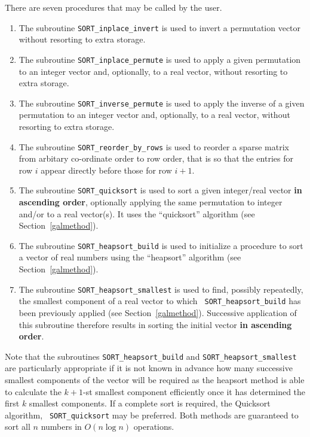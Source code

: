 \documentclass{galahad}
\newcommand{\packagename}{SORT}
\begin{document}
There are seven procedures that may be called by the user.
\begin{enumerate}
\item The subroutine {\tt \packagename\_inplace\_invert} is used to invert a
permutation vector without resorting to extra storage.
\item The subroutine {\tt \packagename\_inplace\_permute} is used to apply
a given permutation to an integer vector and, optionally,
to a real vector, without resorting to extra storage.
\item The subroutine {\tt \packagename\_inverse\_permute} is used to apply
the inverse of a given permutation to an integer vector 
and, optionally, to a real vector, without resorting to extra 
storage.
\item The subroutine {\tt \packagename\_reorder\_by\_rows} is used to 
reorder a sparse matrix from arbitary co-ordinate order to row 
order, that is so that the entries for row $i$ appear directly before
those for row $i+1$.
\item The subroutine {\tt \packagename\_quicksort} is used to sort
a given integer/real vector {\bf in ascending order}, optionally applying the
same permutation to integer and/or to a real vector(s). It uses the
``quicksort'' algorithm (see Section~\ref{galmethod}).
\item The subroutine {\tt \packagename\_heapsort\_build} is used to initialize
a procedure to sort a vector of real numbers using
the ``heapsort'' algorithm (see Section~\ref{galmethod}).
\item The subroutine {\tt \packagename\_heapsort\_smallest} is used to find,
possibly repeatedly, the smallest component of a real vector to which {\tt
\packagename\_heapsort\_build} has been previously applied (see
Section~\ref{galmethod}). Successive application of this subroutine therefore
results in sorting the initial vector {\bf in ascending order}.
\end{enumerate}

\noindent 
Note that the subroutines {\tt \packagename\_heapsort\_build}
and {\tt \packagename\_heapsort\_smallest} are particularly appropriate if
it is not known in advance how many successive smallest components of the
vector will be required as the heapsort method is 
able to calculate the $k+1$-st smallest component efficiently 
once it has determined the first $k$ smallest components.  
If a complete sort is required, the Quicksort algorithm, {\tt
\packagename\_quicksort} may be preferred. Both methods are
guaranteed to sort all $n$ numbers in $O( n \log n )$ operations. 
\end{document}
